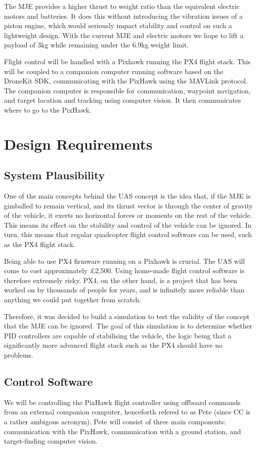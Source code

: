 \documentclass[11pt]{article}
\begin{document}
The MJE provides a higher thrust to weight ratio than the equivalent electric motors and batteries. It does this without introducing the vibration issues of a piston engine, which would seriously impact stability and control on such a lightweight design. With the current MJE and electric motors we hope to lift a payload of 3kg while remaining under the 6.9kg weight limit.

Flight control will be handled with a Pixhawk running the PX4 flight stack. This will be coupled to a companion computer running software based on the DroneKit SDK, communicating with the PixHawk using the MAVLink protocol. The companion computer is responsible for communication, waypoint navigation, and target location and tracking using computer vision. It then communicates where to go to the PixHawk.

\section{Design Requirements}
\subsection{System Plausibility}
One of the main concepts behind the UAS concept is the idea that, if the MJE is gimballed to remain vertical, and its thrust vector is through the center of gravity of the vehicle, it exerts no horizontal forces or moments on the rest of the vehicle. This means its effect on the stability and control of the vehicle can be ignored. In turn, this means that regular quadcopter flight control software can be used, such as the PX4 flight stack.

Being able to use PX4 firmware running on a Pixhawk is crucial. The UAS will come to cost approximately \pounds2,500. Using home-made flight control software is therefore extremely risky. PX4, on the other hand, is a project that has been worked on by thousands of people for years, and is infinitely more reliable than anything we could put together from scratch.

Therefore, it was decided to build a simulation to test the validity of the concept that the MJE can be ignored. The goal of this simulation is to determine whether PID controllers are capable of stabilising the vehicle, the logic being that a significantly more advanced flight stack such as the PX4 should have no problems.

\subsection{Control Software}
We will be controlling the PixHawk flight controller using offboard commands from an external companion computer, henceforth refered to as Pete (since CC is a rather ambigous acronym). Pete will consist of three main components: communication with the PixHawk, communication with a ground station, and target-finding computer vision.
\end{document}
